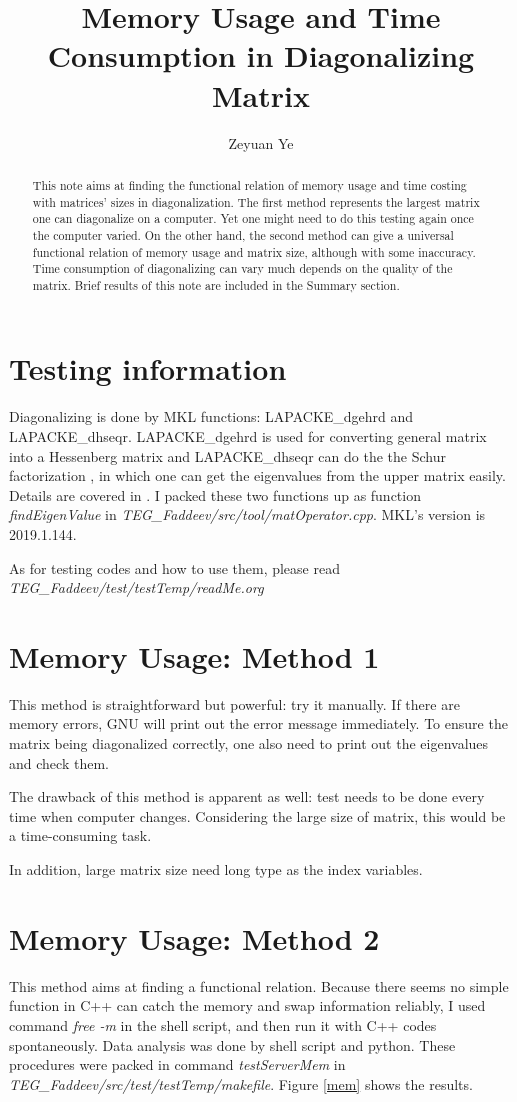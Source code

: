 \documentclass[11pt]{article}
\date{}
\title{Memory Usage and Time Consumption in Diagonalizing Matrix}
\author[1]{Zeyuan Ye}
\begin{document}
  \maketitle

\begin{abstract}
This note aims at finding the functional relation of memory usage and time costing with
matrices’ sizes in diagonalization. The first method represents the largest matrix one can diagonalize on a
computer. Yet one might need to do this testing again once the computer varied. On the other
hand, the second method can give a universal functional relation of memory usage and matrix size,
although with some inaccuracy. Time consumption of diagonalizing can vary much depends on
the quality of the matrix. Brief results of this note are included in the Summary section.
\end{abstract}

\section{Testing information}
Diagonalizing is done by MKL functions: LAPACKE\_dgehrd and LAPACKE\_dhseqr.
LAPACKE\_dgehrd is used for converting general matrix into a Hessenberg matrix and
LAPACKE\_dhseqr can do the the Schur factorization , in which one can get the
eigenvalues from the upper matrix easily. Details are covered in
\cite{lapack, lapack2}. I packed these two functions up as function \textit{findEigenValue} in
\textit{TEG\_Faddeev/src/tool/matOperator.cpp}.
MKL's version is 2019.1.144.

As for testing codes and how to use them, please read \textit{TEG\_Faddeev/test/testTemp/readMe.org}

\section{Memory Usage: Method 1}
This method is straightforward but powerful: try it manually. If there are memory
errors, GNU will print out the error message immediately. To ensure the matrix being
diagonalized correctly, one also need to print out the eigenvalues and check them.

The drawback of this method is apparent as well: test needs to be done every time
when computer changes. Considering the large size of matrix, this would be a
time-consuming task. 

In addition, large matrix size need long type as the index variables.
\section{Memory Usage: Method 2}
This method aims at finding a functional relation. Because there seems no
simple function in C++ can catch the memory and swap information reliably, I used command
\textit{free -m} in the shell script, and then run it with C++ codes spontaneously.
Data analysis was done by shell script and python.
These procedures were packed in command \textit{testServerMem} in \textit{TEG\_Faddeev/src/test/testTemp/makefile}. Figure \ref{mem} shows the results. 
\end{document}
